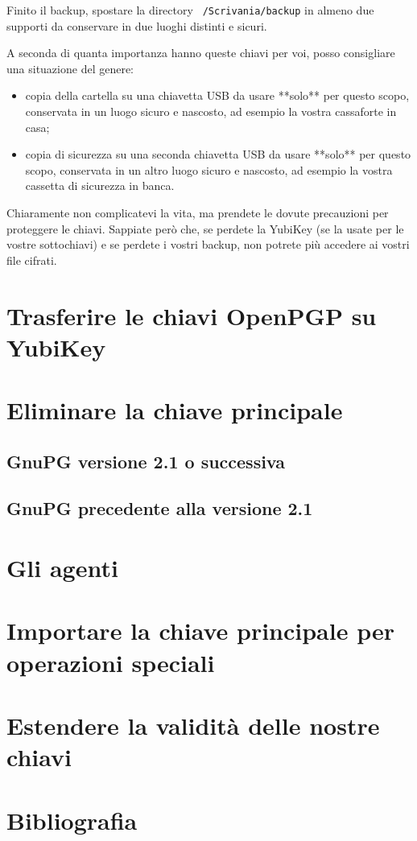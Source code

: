 \documentclass[a4paper,10pt]{article}
\begin{document}
Finito il backup, spostare la directory \texttt{~/Scrivania/backup} in almeno due supporti da conservare in due luoghi distinti e sicuri.

A seconda di quanta importanza hanno queste chiavi per voi, posso consigliare una situazione del genere:

\begin{itemize}
 \item copia della cartella su una chiavetta USB da usare **solo** per questo scopo, conservata in un luogo sicuro e nascosto, ad esempio la vostra cassaforte in casa;
 \item copia di sicurezza su una seconda chiavetta USB da usare **solo** per questo scopo, conservata in un altro luogo sicuro e nascosto, ad esempio la vostra cassetta di sicurezza in banca.
\end{itemize}

Chiaramente non complicatevi la vita, ma prendete le dovute precauzioni per proteggere le chiavi. Sappiate però che, se perdete la YubiKey (se la usate per le vostre sottochiavi) e se perdete i vostri backup, non potrete più accedere ai vostri file cifrati.

\section{Trasferire le chiavi OpenPGP su YubiKey}



\section{Eliminare la chiave principale}
\subsection{GnuPG versione 2.1 o successiva}
\subsection{GnuPG precedente alla versione 2.1}

\section{Gli agenti}

\section{Importare la chiave principale per operazioni speciali}

\section{Estendere la validità delle nostre chiavi}

\section{Bibliografia}
\end{document}
